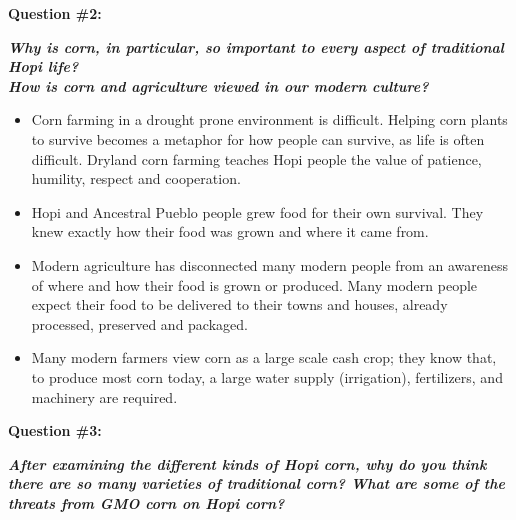 \documentclass[12pt,]{article}
\providecommand{\tightlist}{%
  \setlength{\itemsep}{0pt}\setlength{\parskip}{0pt}}
\begin{document}
\textbf{Question \#2:}

\textbf{\emph{Why is corn, in particular, so important to every aspect of
traditional Hopi life?}}\\
\emph{\textbf{How is corn and agriculture viewed in our modern culture?} }

\begin{itemize}
\tightlist
\item
  Corn farming in a drought prone environment is difficult. Helping
  corn plants to survive becomes a metaphor for how people can
  survive, as life is often difficult. Dryland corn farming teaches
  Hopi people the value of patience, humility, respect and
  cooperation.
\item
  Hopi and Ancestral Pueblo people grew food for their own survival.
  They knew exactly how their food was grown and where it came from.
\item
  Modern agriculture has disconnected many modern people from an
  awareness of where and how their food is grown or produced. Many
  modern people expect their food to be delivered to their towns and
  houses, already processed, preserved and packaged.
\item
  Many modern farmers view corn as a large scale cash crop; they know
  that, to produce most corn today, a large water supply (irrigation),
  fertilizers, and machinery are required.
\end{itemize}

\textbf{Question \#3:}

\textbf{\emph{After examining the different kinds of Hopi corn, why do you think
there are so many varieties of traditional corn? What are some of the
threats from GMO corn on Hopi corn?}}
\end{document}
